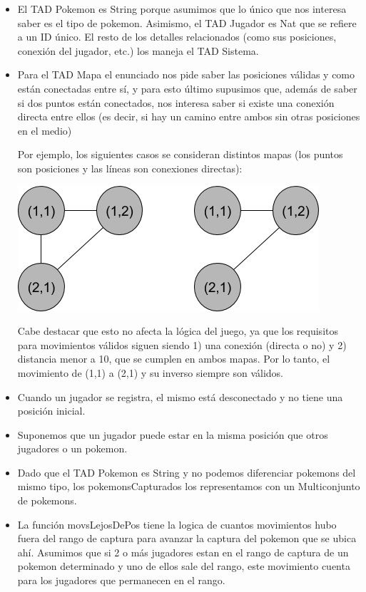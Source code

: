 \renewcommand{\labelitemi}{\textbullet}
\begin{itemize}

\item El TAD Pokemon es String porque asumimos que lo \'unico que nos interesa saber es el tipo de pokemon. Asimismo, el TAD Jugador es Nat que se refiere a un ID \'unico. El resto de los detalles relacionados (como sus posiciones, conexi\'on del jugador, etc.) los maneja el TAD Sistema.

\item Para el TAD Mapa el enunciado nos pide saber las posiciones v\'alidas y como est\'an conectadas entre s\'i, y para esto \'ultimo supusimos que, adem\'as de saber si dos puntos est\'an conectados, nos interesa saber si existe una conexi\'on directa entre ellos (es decir, si hay un camino entre ambos sin otras posiciones en el medio)

Por ejemplo, los siguientes casos se consideran distintos mapas (los puntos son posiciones y las l\'ineas son conexiones directas):

\bigskip
\centerline{\includegraphics[scale=0.5]{nodos-mapa.png}}

Cabe destacar que esto no afecta la l\'ogica del juego, ya que los requisitos para movimientos v\'alidos siguen siendo 1) una conexi\'on (directa o no) y 2) distancia menor a 10, que se cumplen en ambos mapas. Por lo tanto, el movimiento de (1,1) a (2,1) y su inverso siempre son v\'alidos.

\item Cuando un jugador se registra, el mismo est\'a desconectado y no tiene una posici\'on inicial.

\item Suponemos que un jugador puede estar en la misma posici\'on que otros jugadores o un pokemon.

\item Dado que el TAD Pokemon es String y no podemos diferenciar pokemons del mismo tipo, los pokemonsCapturados los representamos con un Multiconjunto de pokemons.

\item La función movsLejosDePos tiene la logica de cuantos movimientos hubo fuera del rango de captura para avanzar la captura del pokemon que se ubica ahí. Asumimos que si 2 o m\'as jugadores estan en el rango de captura de un pokemon determinado y uno de ellos sale del rango, este movimiento cuenta para los jugadores que permanecen en el rango.

\end{itemize}